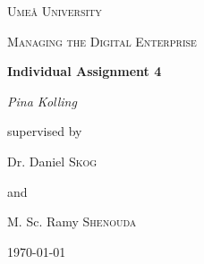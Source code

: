 \documentclass[a4]{scrartcl}
\begin{document}
	
	\begin{titlepage}
		\centering
		{\scshape\LARGE Umeå University \par}
		\vspace{1cm}
		{\scshape\Large Managing the Digital Enterprise \par }
		\vspace{1.5cm}
		{\huge\bfseries   {\color{MidnightBlue}Individual Assignment 4} \par}
		\vspace{2cm}
		{\Large\itshape Pina Kolling\par}
		\vfill
		supervised by \par 
		\vspace{1cm}
		Dr. Daniel \textsc{Skog} \par 
		and \par 
		M. Sc. Ramy \textsc{Shenouda} 
		
		\vfill
		
		{\large \today\par}
	\end{titlepage}
	
	\setcounter{page}{1}
	
	\begin{doublespace}
		\tableofcontents
	\end{doublespace}

	
	\newpage

\end{document}
